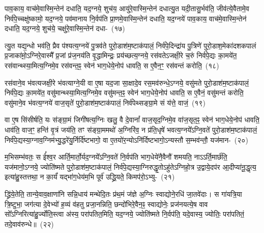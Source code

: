 पाव॒काय॒ वाच॑मे॒वास्मि॒न्तेन॑ दधाति॒ यद॒ग्नये॒ शुच॑य॒ आयु॑रे॒वास्मि॒न्तेन॑ दधात्यु॒त यदी॒तासु॒र्भव॑ति॒ जीव॑त्ये॒वैतामे॒व निर्व॑पे॒च्चक्षु॑ष्कामो॒ यद॒ग्नये॒ पव॑मानाय नि॒र्वप॑ति प्रा॒णमे॒वा\-स्मि॒न्तेन॑ दधाति॒ यद॒ग्नये॑ पाव॒काय॒ वाच॑मे॒वास्मि॒न्तेन॑ दधाति॒ यद॒ग्नये॒ शुच॑ये॒ चक्षु॑रे॒वास्मि॒न्तेन॑ दधा-~(१७)\ip

त्यु॒त यद्य॒न्धो भव॑ति॒ प्रैव प॑श्यत्य॒ग्नये॑ पु॒त्रव॑ते पुरो॒डाश॑\-म॒ष्टा\-क॑पालं॒ निर्व॑पे॒दिन्द्रा॑य पु॒त्रिणे॑ पुरो॒डाश॒मेका॑\-दश\-कपालं प्र॒जाका॑मो़॒\-ऽग्निरे॒वास्मै᳚ प्र॒जां प्र॑ज॒नय॑ति वृ॒द्धामिन्द्रः॒ प्रय॑च्छत्य॒ग्नये॒ रस॑वते\-ऽजक्षी॒रे च॒रुं निर्व॑पे॒द्यः का॒मये॑त॒ रस॑वान्थ्स्या॒मित्य॒ग्निमे॒व रस॑वन्त॒ꣴ॒ स्वेन॑ भाग॒\-धेये॒नोप॑ धावति॒ स ए॒वैन॒ꣳ॒ रस॑वन्तं करोति॒~(१८)\ip

रस॑वाने॒व भ॑वत्यजक्षी॒रे भ॑वत्याग्ने॒यी वा ए॒षा यद॒जा सा॒क्षादे॒व रस॒मव॑\-रुन्धे॒\-ऽग्नये॒ वसु॑मते पुरो॒डाश॑\-म॒ष्टा\-क॑पालं॒ निर्व॑पे॒द्यः का॒मये॑त॒ वसु॑मान्थ्स्या॒मित्य॒ग्निमे॒व वसु॑मन्त॒ꣴ॒ स्वेन॑ भाग॒\-धेये॒नोप॑ धावति॒ स ए॒वैनं॒ वसु॑मन्तं करोति॒ वसु॑माने॒व भ॑वत्य॒ग्नये॑ वाज॒सृते॑ पुरो॒डाश॑\-म॒ष्टा\-क॑पालं॒ निर्व॑पेथ्सङ्ग्रा॒मे सं य॑त्ते॒ वाजं॒~(१९)\ip

वा ए॒ष सि॑सीर्\mbox{}षति॒ यः स॑ङ्ग्रा॒मं जिगी॑षत्य॒ग्निः खलु॒ वै दे॒वानां᳚ वाज॒सृद॒ग्निमे॒व वा॑ज॒सृत॒ꣴ॒ स्वेन॑ भाग॒\-धेये॒नोप॑ धावति॒ धाव॑ति॒ वाज॒ꣳ॒ हन्ति॑ वृ॒त्रं जय॑ति॒ तꣳ स॑ङ्ग्रा॒ममथो॑ अ॒ग्निरि॑व॒ न प्र॑ति॒धृषे॑ भवत्य॒ग्नये᳚\-ऽग्नि॒वते॑ पुरो॒डाश॑\-म॒ष्टा\-क॑पालं॒ निर्व॑पे॒द्यस्या॒ग्नाव॒ग्निम॑भ्यु॒द्धरे॑यु॒र्निर्दि॑ष्टभागो॒ वा ए॒तयो॑र॒न्यो\-ऽनि॑र्दिष्टभागो॒\-ऽन्यस्तौ स॒म्भव॑न्तौ॒ यज॑मान-~(२०)\ip

म॒भिसम्भ॑वतः॒ स ई᳚श्व॒र आर्ति॒मार्तो॒र्यद॒ग्नये᳚\-ऽग्नि॒वते॑ नि॒र्वप॑ति भाग॒\-धेये॑नै॒वैनौ॑ शमयति॒ नाऽऽर्ति॒मार्छ॑ति॒ यज॑मानो॒\-ऽग्नये॒ ज्योति॑ष्मते पुरो॒डाश॑\-म॒ष्टा\-क॑पालं॒ निर्व॑पे॒द्यस्या॒ग्निरुद्धृ॒तो\-ऽहु॑ते\-ऽग्निहो॒त्र उ॒द्वाये॒दप॑र आ॒दीप्या॑नू॒द्धृत्य॒ इत्या॑हु॒स्तत्तथा॒ न का॒र्यं॑ यद्भा॑ग॒धेय॑म॒भि पूर्व॑ उद्ध्रि॒यते॒ किमप॑रो॒\-ऽभ्यु-~(२१)\ip

द्ध्रि॑ये॒तेति॒ तान्ये॒वाव॒क्षाणा॑नि सन्नि॒धाय॑ मन्थेदि॒तः प्र॑थ॒मं ज॑ज्ञे अ॒ग्निः स्वाद्योने॒रधि॑ जा॒तवे॑दाः। स गा॑यत्रि॒या त्रि॒ष्टुभा॒ जग॑त्या दे॒वेभ्यो॑ ह॒व्यं व॑हतु प्रजा॒नन्निति॒ छन्दो॑भिरे॒वैन॒ꣴ॒ स्वाद्योनेः॒ प्रज॑नयत्ये॒ष वाव सो᳚\-ऽग्निरित्या॑हु॒र्ज्योति॒स्त्वा अ॑स्य॒ परा॑पतित॒मिति॒ यद॒ग्नये॒ ज्योति॑ष्मते नि॒र्वप॑ति॒ यदे॒वास्य॒ ज्योतिः॒ परा॑पतितं॒ तदे॒\-वाव॑\-रुन्धे॥~(२२)\ip

{\anuvakamend[{क॒रो॒त्य॒न्ना॒दो द॑धाति॒ यद॒ग्नये॒ शुच॑ये॒ चक्षु॑रे॒वास्मि॒न्तेन॑ दधाति करोति॒ वाजं॒ यज॑मान॒मुदे॒वास्य॒ षट्च॑}]}

